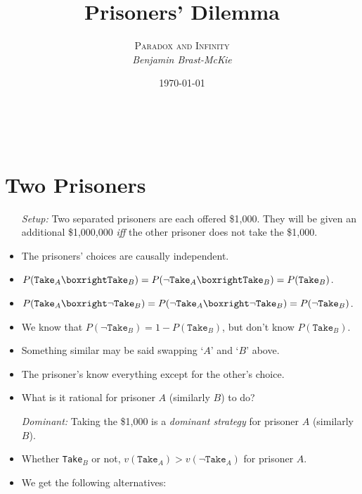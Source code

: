 \documentclass[a4paper, 11pt]{article} %
\title{\textbf{Prisoners' Dilemma}} %
\author{\textsc{Paradox and Infinity}\\ \em Benjamin Brast-McKie} %
\date{\today} %
\makeatletter
\renewcommand{\maketitle}{ %
\begin{flushright} %
{\LARGE\@title} %

\vspace{10pt} %

{\@author} %
\\\@date %

\vspace{-10pt} %
\end{flushright}
}
\makeatother
\begin{document}
\maketitle %

\thispagestyle{empty}


\section*{Two Prisoners}

\begin{itemize}
  \item[\it Setup:] Two separated prisoners are each offered \$1,000. They will be given an additional \$1,000,000 \textit{iff} the other prisoner does not take the \$1,000.
    \item The prisoners' choices are causally independent.
    \item $P(\texttt{Take}_A \boxright \texttt{Take}_B) = P(\neg \texttt{Take}_A \boxright \texttt{Take}_B) = P(\texttt{Take}_B)$.
    \item $P(\texttt{Take}_A \boxright \neg \texttt{Take}_B) = P(\neg \texttt{Take}_A \boxright \neg \texttt{Take}_B) = P(\neg \texttt{Take}_B)$.
    \item We know that $P(\neg \texttt{Take}_B) = 1 - P(\texttt{Take}_B)$, but don't know $P(\texttt{Take}_B)$.
    \item Something similar may be said swapping `$A$' and `$B$' above.
    \item The prisoner's know everything except for the other's choice.
    \item What is it rational for prisoner $A$ (similarly $B$) to do?
  \item[\it Dominant:] Taking the \$1,000 is a \textit{dominant strategy} for prisoner $A$ (similarly $B$).
    \item Whether \texttt{Take}$_B$ or not, $v(\texttt{Take}_A) > v(\neg\texttt{Take}_A)$ for prisoner $A$.
    \item We get the following alternatives:
  \vspace{-.25in}
  \begin{center} \begin{tabular}{>{\centering\arraybackslash}m{2cm}|>{\centering\arraybackslash}m{5cm}|>{\centering\arraybackslash}m{5cm}|}

\end{tabular}
\end{center}
\end{itemize}
\end{document}
